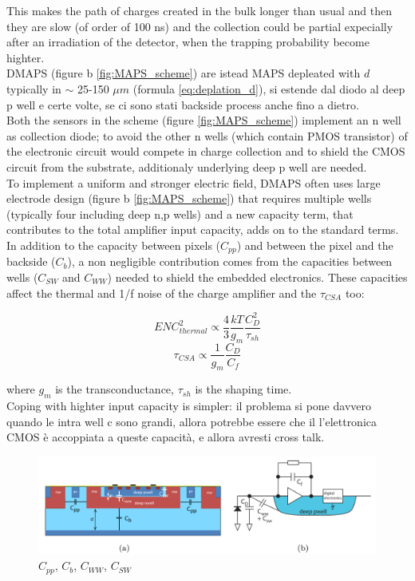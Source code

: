 \begin{titlepage}
This makes the path of charges created in the bulk longer than usual and then they are
slow (of order of 100 ns) and the collection could be partial expecially after
an irradiation of the detector, when the trapping probability become highter. \\
DMAPS (figure b \ref{fig:MAPS_scheme}) are istead MAPS depleated 
with $d$ typically in $\sim$ 25-150 $\mu m$ (formula \ref{eq:deplation_d}),
si estende dal diodo al deep p well e certe volte, se ci sono stati backside process 
anche fino a dietro.\\
Both the sensors in the scheme  (figure \ref{fig:MAPS_scheme}) implement an n well as 
collection diode; to avoid the other n wells (which contain PMOS transistor) of the electronic circuit would compete 
in charge collection and to shield the CMOS circuit from the substrate, additionaly 
underlying deep p well are needed.\\
To implement a uniform and stronger electric field, DMAPS often uses large electrode
design (figure b \ref{fig:MAPS_scheme}) that requires multiple wells 
(typically four including deep n,p wells) and a new capacity term, that contributes to the 
total amplifier input capacity, adds on to the standard terms.
In addition to the capacity between pixels ($C_{pp}$) and
between the pixel and the backside ($C_{b}$), a non negligible contribution comes
from the capacities between wells ($C_{SW}$ and $C_{WW}$) needed to shield the
embedded electronics. These capacities affect the thermal and 1/f noise of the charge amplifier and
the $ \tau_{CSA}$ too:
\begin{multicols}{2}
   \begin{equation}
      ENC^2 _ {thermal} \propto \frac{4}{3}\frac{kT}{g_m}\frac{C_D ^2}{\tau_{sh}}
   \end{equation}\break
   \begin{equation}
     \tau_{CSA} \propto \frac{1}{g_m}\frac{C_D}{C_f}
   \end{equation}
\end{multicols}
where $g_m$ is the transconductance, $\tau_{sh}$ is the shaping time. \\
Coping with highter input capacity is simpler: il problema si pone davvero quando 
le intra well c sono grandi, allora potrebbe essere che il l'elettronica CMOS è 
accoppiata a queste capacità, e allora avresti cross talk.\\
\begin{figure}[h!]
   \centering\includegraphics[width=12cm]{figures/DMAPS_capacity.png}
   \caption{$C_{pp}$, $C_{b}$, $C_{WW}$, $C_{SW}$}
   \label{fig:DMAPS_capacity}
\end{figure}


\end{titlepage}
